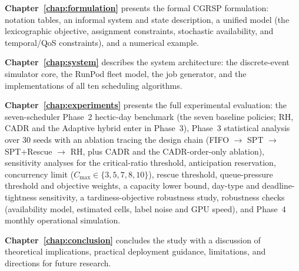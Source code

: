 \textbf{Chapter~\ref{chap:formulation}} presents the formal CGRSP formulation: notation tables, an informal system and state description, a unified model (the lexicographic objective, assignment constraints, stochastic availability, and temporal/QoS constraints), and a numerical example.

\textbf{Chapter~\ref{chap:system}} describes the system architecture: the discrete-event simulator core, the RunPod fleet model, the job generator, and the implementations of all ten scheduling algorithms.

\textbf{Chapter~\ref{chap:experiments}} presents the full experimental evaluation: the seven-scheduler Phase~2 hectic-day benchmark (the seven baseline policies; RH, CADR and the Adaptive hybrid enter in Phase~3), Phase~3 statistical analysis over 30 seeds with an ablation tracing the design chain (FIFO $\to$ SPT $\to$ SPT+Rescue $\to$ RH, plus CADR and the CADR-order-only ablation), sensitivity analyses for the critical-ratio threshold, anticipation reservation, concurrency limit ($C_{\max} \in \{3,5,7,8,10\}$), rescue threshold, queue-pressure threshold and objective weights, a capacity lower bound, day-type and deadline-tightness sensitivity, a tardiness-objective robustness study, robustness checks (availability model, estimated cells, label noise and GPU speed), and Phase~4 monthly operational simulation.

\textbf{Chapter~\ref{chap:conclusion}} concludes the study with a discussion of theoretical implications, practical deployment guidance, limitations, and directions for future research.
